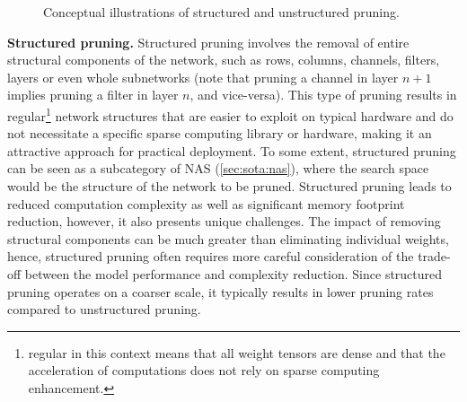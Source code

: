 \begin{figure}
  \centering
  \hspace{0.09\textwidth}
  \caption{Conceptual illustrations of structured and unstructured pruning.}
  \label{fig:sota:pruning}
\end{figure}

\noindent\textbf{Structured pruning.} Structured pruning involves the removal of
entire structural components of the network, such as rows, columns, channels,
filters, layers or even whole subnetworks (note that pruning a channel in layer
$n+1$ implies pruning a filter in layer $n$, and vice-versa). This type of
pruning results in regular\footnote{regular in this context means that all
weight tensors are dense and that the acceleration of computations does not rely
on sparse computing enhancement.} network structures that are easier to exploit
on typical hardware and do not necessitate a specific sparse computing library
or hardware, making it an attractive approach for practical deployment. To some
extent, structured pruning can be seen as a subcategory of \acl{NAS}
(\cref{sec:sota:nas}), where the search space would be the structure of the
network to be pruned. Structured pruning leads to reduced computation complexity
as well as significant memory footprint reduction, however, it also presents
unique challenges. The impact of removing structural components can be much
greater than eliminating individual weights, hence, structured pruning often
requires more careful consideration of the trade-off between the model
performance and complexity reduction. Since structured pruning operates on a
coarser scale, it typically results in lower pruning rates compared to
unstructured pruning.\\


